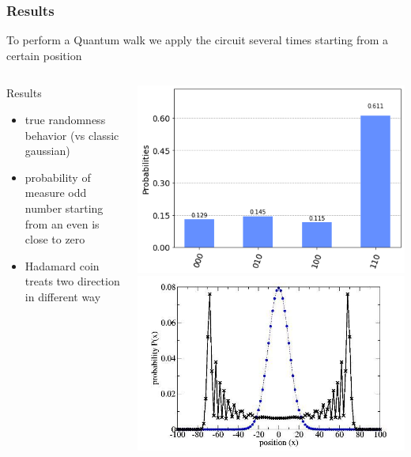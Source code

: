 \documentclass{beamer}
\begin{document}
\begin{frame}
    \frametitle{Results}
    To perform a Quantum walk we apply the circuit several times starting 
    from a certain position

    \begin{columns}[T]
        \begin{column}{.4\textwidth}
            \begin{block}{Results}
                \begin{itemize}
                    \item true randomness behavior (vs classic gaussian)
                    \item probability of measure odd number starting from an even is close to zero
                    \item Hadamard coin treats two direction in different way
                \end{itemize}
            \end{block}
        \end{column}
        \begin{column}{.6\textwidth}
            \includegraphics[scale=0.3]{img/100_steps_walk.png}
            \includegraphics[scale=0.3]{img/dist.jpg}
        \centering
        \end{column}
    \end{columns}
\end{frame}
\end{document}
